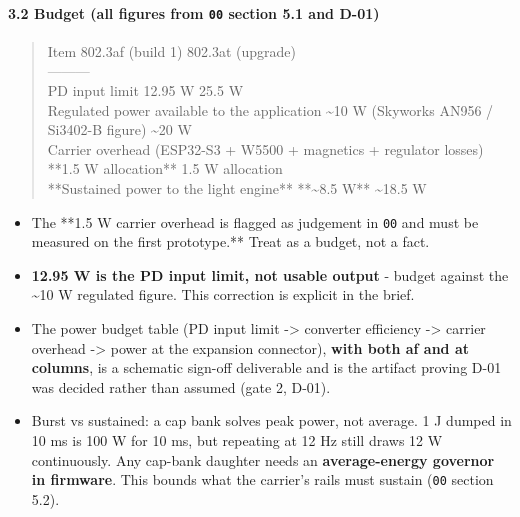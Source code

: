 \documentclass[11pt,a4paper]{article}
\begin{document}
\paragraph*{3.2 Budget (all figures from \texttt{00} section 5.1 and D-01)}
\begin{quote}\small\ttfamily\raggedright
\textbar{} Item \textbar{} 802.3af (build 1) \textbar{} 802.3at (upgrade) \textbar{}\\
\textbar{}---\textbar{}---\textbar{}---\textbar{}\\
\textbar{} PD input limit \textbar{} 12.95 W \textbar{} 25.5 W \textbar{}\\
\textbar{} Regulated power available to the application \textbar{} \textasciitilde{}10 W (Skyworks AN956 / Si3402-B figure) \textbar{} \textasciitilde{}20 W \textbar{}\\
\textbar{} Carrier overhead (ESP32-S3 + W5500 + magnetics + regulator losses) \textbar{} {*}{*}1.5 W allocation{*}{*} \textbar{} 1.5 W allocation \textbar{}\\
\textbar{} {*}{*}Sustained power to the light engine{*}{*} \textbar{} {*}{*}\textasciitilde{}8.5 W{*}{*} \textbar{} \textasciitilde{}18.5 W \textbar{}
\end{quote}
\begin{itemize}
\item The {*}{*}1.5 W carrier overhead is flagged as judgement in \texttt{00} and must be measured on the first
prototype.{*}{*} Treat as a budget, not a fact.
\item \textbf{12.95 W is the PD input limit, not usable output} - budget against the \textasciitilde{}10 W regulated
figure. This correction is explicit in the brief.
\item The power budget table (PD input limit -\textgreater{} converter efficiency -\textgreater{} carrier overhead -\textgreater{} power at
the expansion connector), \textbf{with both af and at columns}, is a schematic sign-off deliverable
and is the artifact proving D-01 was decided rather than assumed (gate 2, D-01).
\item Burst vs sustained: a cap bank solves peak power, not average. 1 J dumped in 10 ms is 100 W for
10 ms, but repeating at 12 Hz still draws 12 W continuously. Any cap-bank daughter needs an
\textbf{average-energy governor in firmware}. This bounds what the carrier's rails must sustain
(\texttt{00} section 5.2).
\end{itemize}
\end{document}
